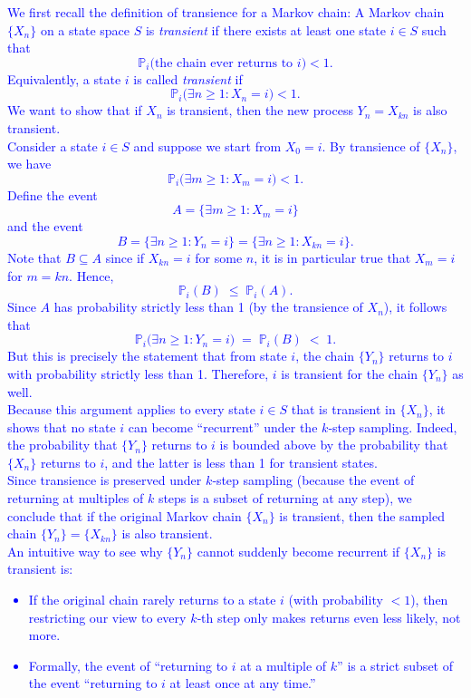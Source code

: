 \documentclass{article}
\begin{document}
\begin{enumerate}
            \textcolor{blue}{We first recall the definition of transience for a Markov chain:
A Markov chain $\{X_n\}$ on a state space $S$ is \emph{transient} if there exists at least one state $i \in S$ such that 
\[
\mathbb{P}_i\bigl(\text{the chain ever returns to } i\bigr) < 1.
\]
Equivalently, a state $i$ is called \emph{transient} if 
\[
\mathbb{P}_i\bigl(\exists n \ge 1: X_n = i\bigr) < 1.
\]
We want to show that if $X_n$ is transient, then the new process $Y_n = X_{kn}$ is also transient.  \\
Consider a state $i \in S$ and suppose we start from $X_0 = i$. 
By transience of $\{X_n\}$, we have
\[
\mathbb{P}_i\bigl(\exists m \ge 1 : X_m = i\bigr) < 1.
\]
Define the event 
\[
A = \{\exists m \ge 1 : X_m = i\}
\]
and the event 
\[
B = \{\exists n \ge 1 : Y_n = i\} = \{\exists n \ge 1 : X_{kn} = i\}.
\]
Note that $B \subseteq A$ since if $X_{kn} = i$ for some $n$, it is in particular true that $X_m = i$ for $m = kn$. Hence,
\[
\mathbb{P}_i(B) \;\le\; \mathbb{P}_i(A).
\]
Since $A$ has probability strictly less than 1 (by the transience of $X_n$), it follows that 
\[
\mathbb{P}_i\bigl(\exists n \ge 1 : Y_n = i\bigr) \;=\; \mathbb{P}_i(B) \;<\; 1.
\]
But this is precisely the statement that from state $i$, the chain $\{Y_n\}$ returns to $i$ with probability strictly less than 1. Therefore, $i$ is transient for the chain $\{Y_n\}$ as well. \\ 
Because this argument applies to every state $i \in S$ that is transient in $\{X_n\}$, it shows that no state $i$ can become ``recurrent'' under the $k$‐step sampling. Indeed, the probability that $\{Y_n\}$ returns to $i$ is bounded above by the probability that $\{X_n\}$ returns to $i$, and the latter is less than 1 for transient states. \\ 
Since transience is preserved under $k$‐step sampling (because the event of returning at multiples of $k$ steps is a subset of returning at any step), we conclude that if the original Markov chain $\{X_n\}$ is transient, then the sampled chain $\{Y_n\} = \{X_{kn}\}$ is also transient. \\ 
An intuitive way to see why $\{Y_n\}$ cannot suddenly become recurrent if $\{X_n\}$ is transient is:
\begin{itemize}
    \item If the original chain rarely returns to a state $i$ (with probability $<1$), then restricting our view to every $k$‐th step only makes returns even less likely, not more.
    \item Formally, the event of ``returning to $i$ at a multiple of $k$'' is a strict subset of the event ``returning to $i$ at least once at any time.''
\end{itemize}}


\end{enumerate}
\end{document}
